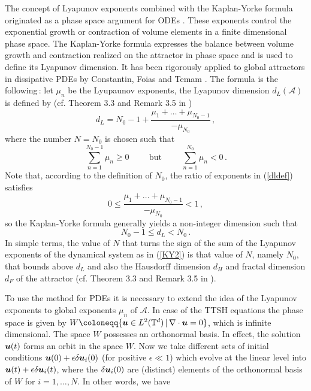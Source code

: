 \documentclass[11pt]{amsart}
\newcommand{\bu}{\mbox{\boldmath$u$}}
\newcommand{\bel}{\begin{equation}\label}
\newcommand{\ee}{\end{equation}}
\theoremstyle{definition}
\numberwithin{equation}{section}
\numberwithin{equation}{section}
\begin{document}
The concept of Lyapunov exponents combined with the Kaplan-Yorke formula originated as a phase space argument for ODEs \cite{KaplanYorke}. These exponents control the exponential growth or contraction of volume elements in a finite dimensional phase space. The Kaplan-Yorke formula expresses the balance between volume growth and contraction realized on the attractor in phase space and is used to define its Lyapunov dimension.  It has been rigorously applied to global attractors in dissipative PDEs by Constantin, Foias and Temam \cite{ConstantinFoiasattractors,CFT2,ConstantinFoias,DGbook}.  The formula is the following\,: let $\mu_{n}$ be the Lyupaunov exponents, the Lyapunov dimension $d_{L}(\mathcal{A})$ is defined by (cf. Theorem 3.3 and Remark 3.5 in \cite[Chapter 5]{temam1997})
\bel{dldef}
d_{L} = N_{0} -1 + \frac{\mu_{1}+\ldots + \mu_{N_{0}-1}}{-\mu_{N_{0}}}\,,
\ee           
where the number $N= N_{0}$ is chosen such that
\bel{KY2}
\sum_{n=1}^{N_{0}-1}\mu_{n}\geq 0 
\hspace{1cm}\mbox{but}\hspace{1cm}
\sum_{n=1}^{N_{0}}\mu_{n} < 0\,.
\ee
Note that, according to the definition of $N_{0}$, the ratio of exponents in (\ref{dldef}) satisfies
\bel{KY1}
0 \leq \frac{\mu_{1}+\ldots + \mu_{N_{0}-1}}{-\mu_{N_{0}}} < 1\,,
\ee          
so the Kaplan-Yorke formula generally yields a non-integer dimension such that 
\bel{KY3}
N_{0} - 1 \leq d_{L} < N_{0}\,. 
\ee
In simple terms, the value of $N$ that turns the sign of the sum of the Lyapunov exponents of the dynamical system as in (\ref{KY2}) is that value of $N$, namely $N_{0}$, that bounds above $d_{L}$ and also the Hausdorff dimension $d_{H}$ and fractal dimension $d_{F}$ of the attractor \cite{ConstantinFoiasattractors,CFT2,ConstantinFoias,DGbook} (cf. Theorem 3.3 and Remark 3.5 in \cite[Chapter 5]{temam1997}).
\par\smallskip
To use the method for PDEs it is necessary to extend the idea of the Lyapunov exponents to global exponents $\mu_{n}$ of $\mathcal{A}$.  In case of the TTSH equations the phase space is given by $W \coloneqq \{ \bu \in L^2 (\mathbb{T}^d) \, \lvert \, \nabla \cdot \bu = 0 \}$, which is infinite dimensional. The space $W$ possesses an orthonormal basis. In effect, the solution $\bu(t)$ forms an orbit in the space $W$.  Now we take different sets of initial conditions
$\bu(0) + \epsilon \delta\bu_{i}(0)$ (for positive $\epsilon \ll 1$) which evolve at the linear level into $\bu(t)+\epsilon \delta\bu_{i}(t)$, where the $\delta\bu_{i}(0)$ are (distinct) elements of the orthonormal basis of $W$ for $i =1,\ldots,N$. In other words, we have
\end{document}
